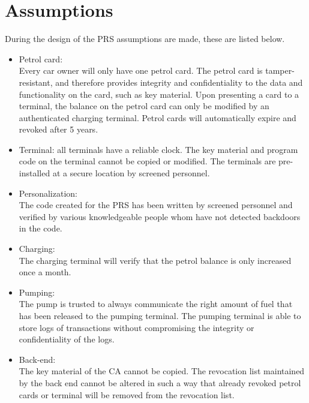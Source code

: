 \section{Assumptions}
During the design of the PRS assumptions are made, these are listed below.
\begin{itemize}
\item Petrol card:\\
Every car owner will only have one petrol card. The petrol card is tamper-resistant, and therefore provides integrity and confidentiality to the data and functionality on the card, such as key material. Upon presenting a card to a terminal, the balance on the petrol card can only be modified by an authenticated charging terminal.  Petrol cards will automatically expire and revoked after 5 years.

\item Terminal: all terminals have a reliable clock. The key material and program code on the terminal cannot be copied or modified. The terminals are pre-installed at a secure location by screened personnel.

\item Personalization:\\
The code created for the PRS has been written by screened personnel and verified by various knowledgeable people whom have not detected backdoors in the code. %

\item Charging:\\
The charging terminal will verify that the petrol balance is only increased once a month. 

\item Pumping:\\
The pump is trusted to always communicate the right amount of fuel that has been released to the pumping terminal. The pumping terminal is able to store logs of transactions without compromising the integrity or confidentiality of the logs.

\item Back-end:\\
The key material of the CA cannot be copied. The revocation list maintained by the back end cannot be altered in such a way that already revoked petrol cards or terminal will be removed from the revocation list. 
\end{itemize}

 
